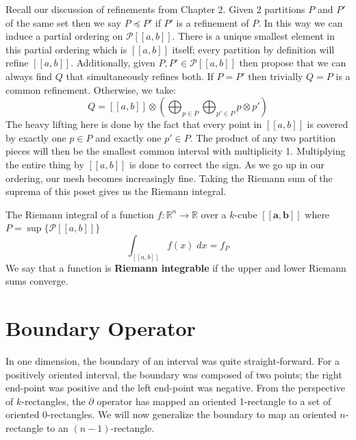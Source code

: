 Recall our discussion of refinements from Chapter 2.
Given 2 partitions $P$ and $P'$ of the same set then we say $P \preceq P'$ if $P'$ is a refinement of $P$.
In this way we can induce a partial ordering on $\mathcal{P}[\![a,b]\!]$.
There is a unique smallest element in this partial ordering which is $[\![a,b]\!]$ itself; 
every partition by definition will refine $[\![a,b]\!]$.
Additionally, given $P,P' \in \mathcal{P}[\![a,b]\!]$ then propose that we can always find $Q$ that simultaneously refines both.
If $P=P'$ then trivially $Q=P$ is a common refinement.
Otherwise, we take:
\begin{equation}
	Q= [\![a,b]\!] \otimes \left( \bigoplus_{p\in P} \bigoplus_{p' \in P} p \otimes p' \right)
\end{equation}
The heavy lifting here is done by the fact that every point in $[\![a,b]\!]$ is covered by exactly one $p\in P$ and exactly one $p' \in P$.
The product of any two partition pieces will then be the smallest common interval with multiplicity 1.
Multiplying the entire thing by $[\![a,b]\!]$ is done to correct the sign.
As we go up in our ordering, our mesh becomes increasingly fine.
Taking the Riemann sum of the suprema of this poset gives us the Riemann integral.

\begin{definition}
The Riemann integral of a function $f:\mathbb{R}^n \to \mathbb{R}$ over a $k$-cube $[\![\boldsymbol{a}, \boldsymbol{b}]\!]$
where $P = \sup \Big\{ \mathcal{P} [\![a,b]\!] \Big\}$
	\begin{equation}
		\int_{[\![a,b]\!]} f(x) \; dx = f_P
	\end{equation} 
	We say that a function is \textbf{Riemann integrable} if the upper and lower Riemann sums converge.
\end{definition}


%
%
\newpage
\section{Boundary Operator}


In one dimension, the boundary of an interval was quite straight-forward.
For a positively oriented interval, the boundary was composed of two points; 
the right end-point was positive and the left end-point was negative.
From the perspective of $k$-rectangles, 
the $\partial$ operator has mapped an oriented 1-rectangle to a set of oriented 0-rectangles.
We will now generalize the boundary to map an oriented $n$-rectangle to an $(n-1)$-rectangle.


